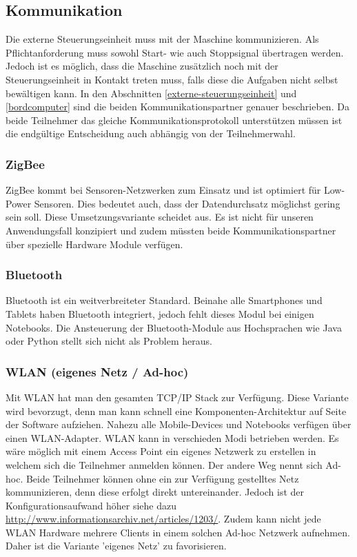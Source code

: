 \subsection{Kommunikation}
Die externe Steuerungseinheit muss mit der Maschine kommunizieren. Als Pflichtanforderung muss sowohl Start- wie auch Stoppsignal übertragen werden. Jedoch ist es möglich, dass die Maschine zusätzlich noch mit der Steuerungseinheit in Kontakt treten muss, falls diese die Aufgaben nicht selbst bewältigen kann. In den Abschnitten \ref{externe-steuerungseinheit} und \ref{bordcomputer} sind die beiden Kommunikationspartner genauer beschrieben. Da beide Teilnehmer das gleiche Kommunikationsprotokoll unterstützen müssen ist die endgültige Entscheidung auch abhängig von der Teilnehmerwahl. 

\subsubsection{ZigBee}
ZigBee kommt bei Sensoren-Netzwerken zum Einsatz und ist optimiert für Low-Power Sensoren. Dies bedeutet auch, dass der Datendurchsatz möglichst gering sein soll. Diese Umsetzungsvariante scheidet aus. Es ist nicht für unseren Anwendungsfall konzipiert und zudem müssten beide Kommunikationspartner über spezielle Hardware Module verfügen.

\subsubsection{Bluetooth}
Bluetooth ist ein weitverbreiteter Standard. Beinahe alle Smartphones und Tablets haben Bluetooth integriert, jedoch fehlt dieses Modul bei einigen Notebooks. Die Ansteuerung der Bluetooth-Module aus Hochsprachen wie Java oder Python stellt sich nicht als Problem heraus.

\subsubsection{WLAN (eigenes Netz / Ad-hoc)}
Mit WLAN hat man den gesamten TCP/IP Stack zur Verfügung. Diese Variante wird bevorzugt, denn man kann schnell eine Komponenten-Architektur auf Seite der Software aufziehen. Nahezu alle Mobile-Devices und Notebooks verfügen über einen WLAN-Adapter.\newline
WLAN kann in verschieden Modi betrieben werden. Es wäre möglich mit einem Access Point ein eigenes Netzwerk zu erstellen in welchem sich die Teilnehmer anmelden können. Der andere Weg nennt sich Ad-hoc. Beide Teilnehmer können ohne ein zur Verfügung gestelltes Netz kommunizieren, denn diese erfolgt direkt untereinander. Jedoch ist der Konfigurationsaufwand höher siehe dazu \href{http://www.informationsarchiv.net/articles/1203/}{http://www.informationsarchiv.net/articles/1203/}. Zudem kann nicht jede WLAN Hardware mehrere Clients in einem solchen Ad-hoc Netzwerk aufnehmen. Daher ist die Variante 'eigenes Netz' zu favorisieren.
